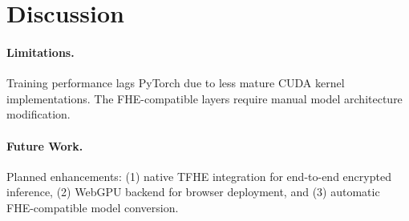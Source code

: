 \section{Discussion}


\paragraph{Limitations.} Training performance lags PyTorch due to less mature CUDA kernel implementations. The FHE-compatible layers require manual model architecture modification.

\paragraph{Future Work.} Planned enhancements: (1) native TFHE integration for end-to-end encrypted inference, (2) WebGPU backend for browser deployment, and (3) automatic FHE-compatible model conversion.

